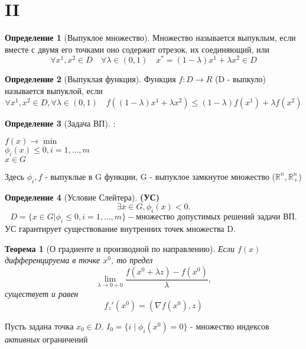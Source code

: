 \documentclass[a4paper]{article}
\newtheorem{theorem}{Теорема}[section]
\theoremstyle{definition}
\newtheorem*{definition}{Определение}
\theoremstyle{remark}
\begin{document}
\section{II}
\begin{definition}[Выпуклое множество]
	Множество называется выпуклым, если вместе с двумя его точками оно содержит отрезок, их соединяющий, или
	\[\forall x^1, x^2 \in D \quad \forall \lambda \in (0, 1) \quad
		x^* = (1 - \lambda)x^1 + \lambda x^2 \in D\]
\end{definition}
\begin{definition}[Выпуклая функция]
	Функция $f:D\to R$ (D - выпкуло) называется выпуклой, если
	\[\forall x^1, x^2 \in D, \forall \lambda \in (0, 1) \quad f((1-\lambda)x^1 +\lambda x^2) \le
		(1-\lambda)f(x^1) + \lambda f(x^2)\]
\end{definition}\begin{definition}[Задача ВП]:
	\begin{center}
		\(f(x) \to \min\) \\
		\(\phi_i(x) \le 0, i = 1, \dots, m\)\\
		\(x \in G\)
	\end{center}
	Здесь $\phi_i, f$ - выпуклые в G функции,
	G - выпуклое замкнутое множество ($\mathbb{R}^n,\mathbb{R}_+^n $)

\end{definition}
\begin{definition}[Условие Слейтера]
	\textbf{(УС)}
	\[\exists \overline{x}\in G, \phi_i(\overline{x})<0.\]
	\[D = \{x\in G|\phi_i \le 0, i = 1, \dots, m\} - \textbf{множество допустимых решений задачи ВП.}\]
	УС гарантирует существование внутренних точек множества D.
\end{definition}
\begin{theorem}[О градиенте и производной по направлению]
	Если $f(x)$ дифференцируема в точке $x^0$, то
	предел
	\[\lim_{\lambda \to 0+0} \frac{f(x^0+\lambda z) - f(x^0)}{\lambda},\] существует и равен
	\[f_z'(x^0) = (\nabla f(x^0), z)\]
\end{theorem}

Пусть задана точка $x_0\in D$.
$I_0 = \{i \; | \; \phi_i(x^0) = 0\}$ - множество индексов \textit{активных} ограничений
\end{document}
